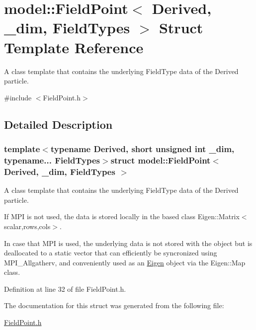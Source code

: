 \hypertarget{structmodel_1_1_field_point}{}\section{model\+:\+:Field\+Point$<$ Derived, \+\_\+dim, Field\+Types $>$ Struct Template Reference}
\label{structmodel_1_1_field_point}


A class template that contains the underlying Field\+Type data of the Derived particle.  




{\ttfamily \#include $<$Field\+Point.\+h$>$}



\subsection{Detailed Description}
\subsubsection*{template$<$typename Derived, short unsigned int \+\_\+dim, typename... Field\+Types$>$struct model\+::\+Field\+Point$<$ Derived, \+\_\+dim, Field\+Types $>$}

A class template that contains the underlying Field\+Type data of the Derived particle. 

If M\+P\+I is not used, the data is stored locally in the based class Eigen\+::\+Matrix$<$scalar,rows,cols$>$.

In case that M\+P\+I is used, the underlying data is not stored with the object but is deallocated to a static vector that can efficiently be syncronized using M\+P\+I\+\_\+\+Allgatherv, and conveniently used as an \hyperlink{namespace_eigen}{Eigen} object via the Eigen\+::\+Map class. 

Definition at line 32 of file Field\+Point.\+h.



The documentation for this struct was generated from the following file\+:\begin{DoxyCompactItemize}
\item 
\hyperlink{_field_point_8h}{Field\+Point.\+h}\end{DoxyCompactItemize}

